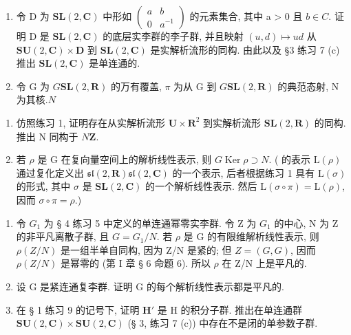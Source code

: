 
\begin{enumerate}
\def\labelenumi{\arabic{enumi}.}
\item
  令 D 为 \(\mathbf{SL}(2,\mathbf{C})\) 中形如 \(\begin{pmatrix}a & b \\ 0 & a^{-1}\end{pmatrix}\) 的元素集合, 其中 a \textgreater{} 0 且 \(b \in C\). 证明 D 是 \(\mathbf{SL}(2,\mathbf{C})\) 的底层实李群的李子群, 并且映射 \((u,d) \mapsto ud\) 从 \(\mathbf{SU}(2,\mathbf{C}) \times \mathbf{D}\) 到 \(\mathbf{SL}(2,\mathbf{C})\) 是实解析流形的同构. 由此以及 §3 练习 7 (c) 推出 \(\mathbf{SL}(2,\mathbf{C})\) 是单连通的.
\item
  令 G 为 \(G\)\(\mathbf{SL}(2, \mathbf{R})\) 的万有覆盖, \(\pi\) 为从 G 到 \(G\)\(\mathbf{SL}(2, \mathbf{R})\) 的典范态射, N 为其核.\(N\)
\end{enumerate}

\begin{enumerate}
\def\labelenumi{(\alph{enumi})}
\item
  仿照练习 1, 证明存在从实解析流形 \(\mathbf{U} \times \mathbf{R}^2\) 到实解析流形 \(\mathbf{SL}(2, \mathbf{R})\) 的同构. 推出 N 同构于 \(N\)\(\mathbf{Z}\).
\item
  若 \(\rho\) 是 G 在复向量空间上的解析线性表示, 则 \(G\)\(\operatorname{Ker} \rho \supset N\). ( 的表示 \(\mathrm{L}(\rho)\) 通过复化定义出 \(\mathfrak{sl}(2, \mathbf{R})\)\(\mathfrak{sl}(2, \mathbf{C})\) 的一个表示, 后者根据练习 1 具有 \(\mathrm{L}(\sigma)\) 的形式, 其中 \(\sigma\) 是 \(\mathbf{SL}(2, \mathbf{C})\) 的一个解析线性表示. 然后 \(\mathrm{L}(\sigma \circ \pi) = \mathrm{L}(\rho)\), 因而 \(\sigma \circ \pi = \rho\).)
\end{enumerate}

\begin{enumerate}
\def\labelenumi{\arabic{enumi}.}
\setcounter{enumi}{2}
\item
  令 \(G_{1}\) 为 § 4 练习 5 中定义的单连通幂零实李群. 令 Z 为 \(G_{1}\) 的中心, N 为 Z 的非平凡离散子群, 且 \(G = G_{1}/N\). 若 \(\rho\) 是 G 的有限维解析线性表示, 则 \(\rho(Z/N)\) 是一组半单自同构, 因为 Z/N 是紧的; 但 \(Z = (G, G)\), 因而 \(\rho(Z/N)\) 是幂零的 (第 I 章 § 6 命题 6). 所以 \(\rho\) 在 Z/N 上是平凡的.
\item
  设 G 是紧连通复李群. 证明 G 的每个解析线性表示都是平凡的.
\item
  在 § 1 练习 9 的记号下, 证明 \(\mathbf{H}'\) 是 H 的积分子群. 推出在单连通群 \(\mathbf{SU}(2,\mathbf{C})\times \mathbf{SU}(2,\mathbf{C})\) (§ 3, 练习 7 (c)) 中存在不是闭的单参数子群.
\end{enumerate}

